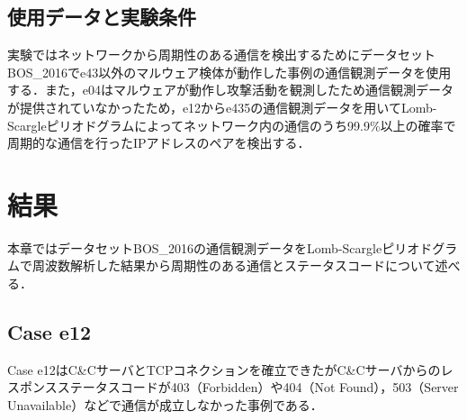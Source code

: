 \documentclass[twocolumn]{ltjsarticle}
\begin{document}
\subsection{使用データと実験条件}
実験ではネットワークから周期性のある通信を検出するためにデータセットBOS\_2016でe43以外のマルウェア検体が動作した事例の通信観測データを使用する．また，e04はマルウェアが動作し攻撃活動を観測したため通信観測データが提供されていなかったため，e12からe435の通信観測データを用いてLomb-Scargleピリオドグラムによってネットワーク内の通信のうち99.9\%以上の確率で周期的な通信を行ったIPアドレスのペアを検出する．

\section{結果}
本章ではデータセットBOS\_2016の通信観測データをLomb-Scargleピリオドグラムで周波数解析した結果から周期性のある通信とステータスコードについて述べる．

\subsection{Case e12}
Case e12はC\&CサーバとTCPコネクションを確立できたがC\&Cサーバからのレスポンスステータスコードが403（Forbidden）や404（Not Found），503（Server Unavailable）などで通信が成立しなかった事例である．
\end{document}
